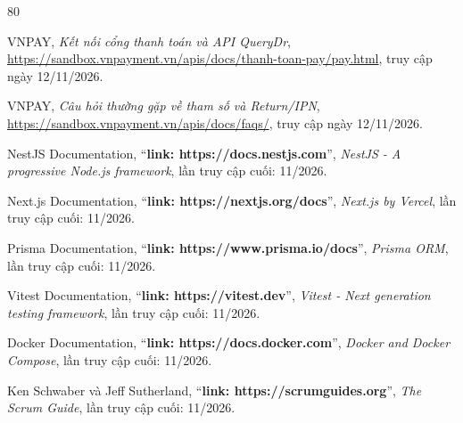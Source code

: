 \documentclass[a4paper]{article}
\begin{document}
\clearpage
\clearpage
\begin{thebibliography}{80}

VNPAY, \textit{Kết nối cổng thanh toán và API QueryDr},
\url{https://sandbox.vnpayment.vn/apis/docs/thanh-toan-pay/pay.html},
truy cập ngày 12/11/2026.

VNPAY, \textit{Câu hỏi thường gặp về tham số và Return/IPN},
\url{https://sandbox.vnpayment.vn/apis/docs/faqs/},
truy cập ngày 12/11/2026.

NestJS Documentation,
``\textbf{link: https://docs.nestjs.com}'',
\textit{NestJS - A progressive Node.js framework}, lần truy cập cuối: 11/2026.

Next.js Documentation,
``\textbf{link: https://nextjs.org/docs}'',
\textit{Next.js by Vercel}, lần truy cập cuối: 11/2026.

Prisma Documentation,
``\textbf{link: https://www.prisma.io/docs}'',
\textit{Prisma ORM}, lần truy cập cuối: 11/2026.

Vitest Documentation,
``\textbf{link: https://vitest.dev}'',
\textit{Vitest - Next generation testing framework}, lần truy cập cuối: 11/2026.

Docker Documentation,
``\textbf{link: https://docs.docker.com}'',
\textit{Docker and Docker Compose}, lần truy cập cuối: 11/2026.

Ken Schwaber và Jeff Sutherland,
``\textbf{link: https://scrumguides.org}'',
\textit{The Scrum Guide}, lần truy cập cuối: 11/2026.

\end{thebibliography}
\end{document}
